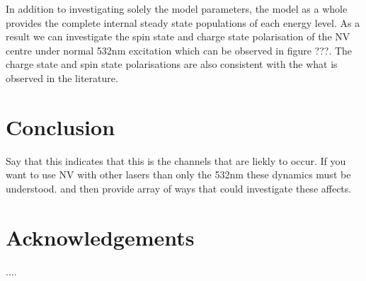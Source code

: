 \documentclass[,prl,twocolumn]{revtex4}
\begin{document}
In addition to investigating solely the model parameters, the model as a whole provides the complete internal steady state populations of each energy level. As a result we can investigate the spin state and charge state polarisation of the NV centre under normal 532nm excitation which can be observed in figure ???. The charge state and spin state polarisations are also consistent with the what is observed in the literature.


\section{Conclusion}
Say that this indicates that this is the channels that are liekly to occur. If you want to use NV with other lasers than only the 532nm these dynamics must be understood. and then provide array of ways that could investigate these affects.
    


\section*{Acknowledgements}

....

%
%
%




\begin{thebibliography}{27}






\end{thebibliography}
\end{document}
